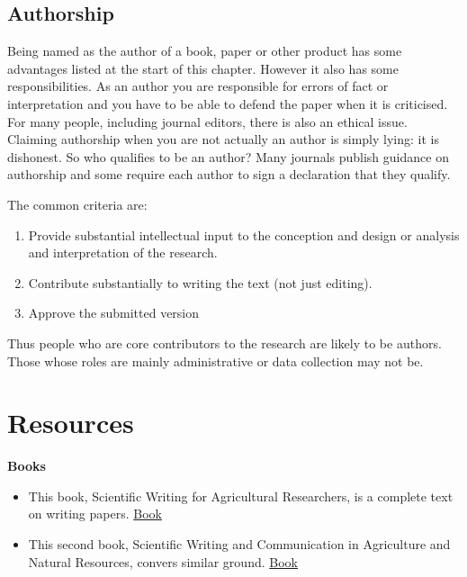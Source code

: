\documentclass[
  titlepage]{book}
\begin{document}
\hypertarget{authorship}{%
\subsection{Authorship}\label{authorship}}

Being named as the author of a book, paper or other product has some advantages listed at the start of this chapter. However it also has some responsibilities. As an author you are responsible for errors of fact or interpretation and you have to be able to defend the paper when it is criticised. For many people, including journal editors, there is also an ethical issue. Claiming authorship when you are not actually an author is simply lying: it is dishonest. So who qualifies to be an author?
Many journals publish guidance on authorship and some require each author to sign a declaration that they qualify.

The common criteria are:

\begin{enumerate}
\def\labelenumi{\arabic{enumi}.}
\item
  Provide substantial intellectual input to the conception and design or analysis and interpretation of the research.
\item
  Contribute substantially to writing the text (not just editing).
\item
  Approve the submitted version
\end{enumerate}

Thus people who are core contributors to the research are likely to be authors. Those whose roles are mainly administrative or data collection may not be.

\hypertarget{resources-1}{%
\section{Resources}\label{resources-1}}

\textbf{Books}

\begin{itemize}
\item
  This book, Scientific Writing for Agricultural Researchers, is a complete text on writing papers. \href{https://www.coraf.org/documents/CTA116_scientificwritingbook\%20FINAL\%20nov\%202012.pdf}{Book}
\item
  This second book, Scientific Writing and Communication in Agriculture and Natural Resources, convers similar ground. \href{https://link.springer.com/content/pdf/10.1007\%2F978-3-319-03101-9.pdf}{Book}
\end{itemize}
\end{document}
